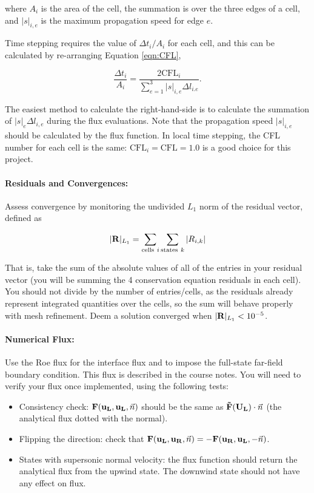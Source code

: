 where $A_i$ is the area of the cell, the summation is over the three edges of a cell, and $|s|_{i,e}$ is the
maximum propagation speed for edge $e$.

Time stepping requires the value of $\Delta t_i/A_i$ for each cell, and this can be calculated by re-arranging
Equation \ref{eqn:CFL},

\begin{equation}\label{eqn:time_stepping}
    \frac{\Delta t_i}{A_i} = \frac{2\text{CFL}_i}{\sum_{e=1}^{3}|s|_{i,e}\Delta l_{i.e}}.
\end{equation}

\pagebreak
The easiest method to calculate the right-hand-side is to calculate the summation of $|s|_e \Delta l_{i,e}$ during the flux evaluations. Note that the propagation speed $|s|_{i,e}$ should be calculated by the flux function. In local time stepping, the CFL number for each cell is the same: $\text{CFL}_i = \text{CFL} = 1.0$ is a good choice for this project.

\paragraph{Residuals and Convergences:} Assess convergence by monitoring the undivided $L_1$ norm of the residual vector, defined as

\begin{equation}\label{eqn:residual_vector}
    |{\bf R}|_{L_1} = \sum_{\text{cells}\ i} \sum_{\text{states}\ k}|R_{i,k}|
\end{equation}

That is, take the sum of the absolute values of all of the entries in your residual vector (you will be summing the 4 conservation equation residuals in each cell). You should not divide by the number of entries/cells, as the residuals already represent integrated quantities over the cells, so the sum will behave properly with mesh refinement. Deem a solution converged when $|{\bf R}|_{L_1} < 10^{-5}$.

\paragraph{Numerical Flux:} Use the Roe flux for the interface flux and to impose the full-state far-field boundary condition. This flux is described in the course notes. You will need to verify your flux once implemented, using the following tests:

\begin{itemize}
    \item Consistency check: ${\bf F(u_L, u_L}, \vec{n})$ should be the same as $ {\bf \vec{F}(U_L)}\cdot \vec{n}$ (the analytical flux dotted with the normal).
    \item Flipping the direction: check that $ {\bf F(u_L, u_R} , \vec{n} ) =  {\bf-F(u_R , u_L }, -\vec{n} )$.
    \item States with supersonic normal velocity: the flux function should return the analytical flux from the upwind state. The downwind state should not have any effect on flux.
\end{itemize}


